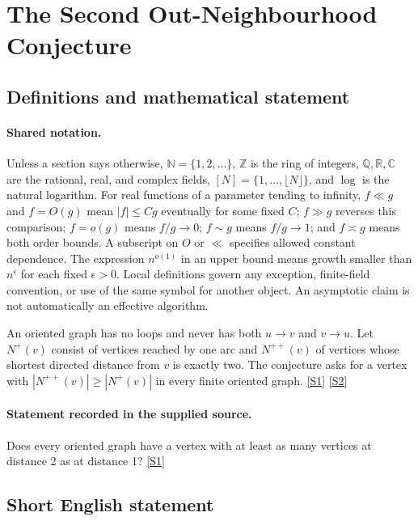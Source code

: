 \documentclass[11pt,a4paper]{article}
\newcommand{\N}{\mathbb{N}}
\newcommand{\Z}{\mathbb{Z}}
\newcommand{\Q}{\mathbb{Q}}
\newcommand{\R}{\mathbb{R}}
\newcommand{\C}{\mathbb{C}}
\newcommand{\sref}[2]{\hyperlink{source:#1:#2}{[S#2]}}
\begin{document}
\section{The Second Out-Neighbourhood Conjecture}\label{statement}


\subsection{Definitions and mathematical statement}

\paragraph{Shared notation.}Unless a section says otherwise, $\N=\{1,2,\ldots\}$,
$\Z$ is the ring of integers, $\Q,\R,\C$ are the rational, real, and complex
fields, $[N]=\{1,\ldots,\lfloor N\rfloor\}$, and $\log$ is the natural
logarithm. For real functions of a parameter tending to infinity,
$f\ll g$ and $f=O(g)$ mean $|f|\leq Cg$ eventually for some fixed $C$;
$f\gg g$ reverses this comparison; $f=o(g)$ means $f/g\to0$;
$f\sim g$ means $f/g\to1$; and $f\asymp g$ means both order bounds.
A subscript on $O$ or $\ll$ specifies allowed constant dependence.
The expression $n^{o(1)}$ in an upper bound means growth smaller than
$n^\epsilon$ for each fixed $\epsilon>0$. Local definitions govern any
exception, finite-field convention, or use of the same symbol for another
object. An asymptotic claim is not automatically an effective algorithm.



An oriented graph has no loops and never has both $u\to v$ and $v\to u$. Let $N^+(v)$ consist of vertices reached by one arc and $N^{++}(v)$ of vertices whose shortest directed distance from $v$ is exactly two. The conjecture asks for a vertex with $|N^{++}(v)|\geq|N^+(v)|$ in every finite oriented graph. \sref{statement}{1} \sref{statement}{2}

\paragraph{Statement recorded in the supplied source.}
Does every oriented graph have a vertex with at least as many vertices at distance 2 as at distance 1? \sref{statement}{1}

\subsection{Short English statement}
\end{document}
